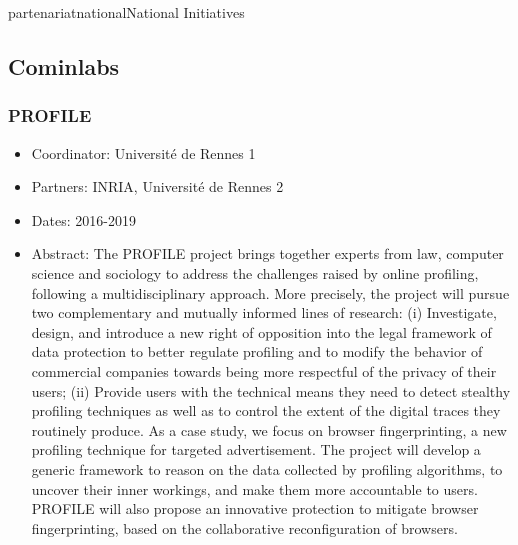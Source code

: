 \documentclass{ra2018}
\begin{document}
\begin{module}{partenariat}{national}{National Initiatives}
\subsection{Cominlabs}
\subsubsection*{\label{project:profile}PROFILE}

\begin{itemize}
	\item Coordinator: Universit\'e de Rennes 1
	\item Partners: INRIA, Universit\'e de Rennes 2
	\item Dates: 2016-2019
	\item Abstract:  The PROFILE project brings together experts from law, computer science and sociology to address the challenges raised by online profiling, following a multidisciplinary approach. More precisely, the project will pursue two complementary and mutually informed lines of research: (i) Investigate, design, and introduce a new right of opposition into the legal framework of data protection to better regulate profiling and to modify the behavior of commercial companies towards being more respectful of the privacy of their users; (ii) Provide users with the technical means they need to detect stealthy profiling techniques as well as to control the extent of the digital traces they routinely produce. As a case study, we focus on browser fingerprinting, a new profiling technique for targeted advertisement. The project will develop a generic framework to reason on the data collected by profiling algorithms, to uncover their inner workings, and make them more accountable to users. PROFILE will also propose an innovative protection to mitigate browser fingerprinting, based on the collaborative reconfiguration of browsers.
\end{itemize}

 \end{module} 




\end{document}
